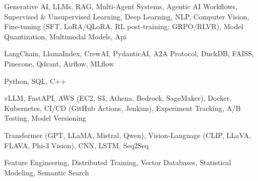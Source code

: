 \documentclass[letter,10pt]{article}
\begin{document}
 Generative AI, LLMs, RAG, Multi-Agent Systems, Agentic AI Workflows, Supervised \& Unsupervised Learning, Deep Learning, NLP, Computer Vision, Fine-tuning (SFT, LoRA/QLoRA, RL post-training: GRPO/RLVR), Model Quantization, Multimodal Models, Api\par\vspace{2pt}

 LangChain, LlamaIndex, CrewAI, PydanticAI, A2A Protocol, DuckDB, FAISS, Pinecone, Qdrant, Airflow, MLflow\par\vspace{2pt}

 Python, SQL, C++\par\vspace{2pt}

 vLLM, FastAPI, AWS (EC2, S3, Athena, Bedrock, SageMaker), Docker, Kubernetes, CI/CD (GitHub Actions, Jenkins), Experiment Tracking, A/B Testing, Model Versioning\par\vspace{2pt}

 Transformer (GPT, LLaMA, Mistral, Qwen), Vision-Language (CLIP, LLaVA, FLAVA, Phi-3 Vision), CNN, LSTM, Seq2Seq\par\vspace{2pt}

 Feature Engineering, Distributed Training, Vector Databases, Statistical Modeling, Semantic Search
\end{document}
